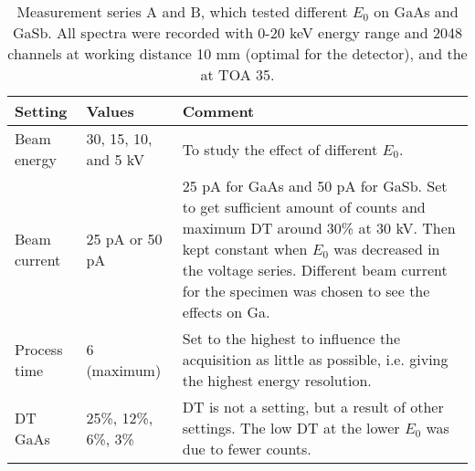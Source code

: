 \begin{table}[phtb]
    \begin{center}
        \caption{
            Measurement series A and B, which tested different $E_0$ on GaAs and GaSb.
            All spectra were recorded with 0-20 keV energy range and 2048 channels at working distance 10 mm (optimal for the detector), and the at TOA 35\textdegree.
        }
        \renewcommand*{\arraystretch}{1.2}
        \label{tab:method:acquisition_settings:voltage}
        \begin{tabular}{p{2cm}p{3cm}p{8.6cm}}
            \hline
            \textbf{Setting}    & \textbf{Values}      & \textbf{Comment}                                                                                                                                                                                                                                               \\
            \hline
            Beam energy         & 30, 15, 10, and 5 kV & To study the effect of different $E_0$.                                                                                                                                                                                                                        \\
            Beam current        & 25 pA or 50 pA       & 25 pA for GaAs and 50 pA for GaSb. Set to get sufficient amount of counts and maximum DT around 30\% at 30 kV. Then kept constant when $E_0$ was decreased in the voltage series. Different beam current for the specimen was chosen to see the effects on Ga. \\
            Process time        & 6 (maximum)          & Set to the highest to influence the acquisition as little as possible, i.e. giving the highest energy resolution.                                                                                                                                              \\
            DT GaAs             & 25\%, 12\%, 6\%, 3\% & DT is not a setting, but a result of other settings. The low DT at the lower $E_0$ was due to fewer counts.                                                                                                                                                    \\

\end{tabular}
\end{center}
\end{table}
